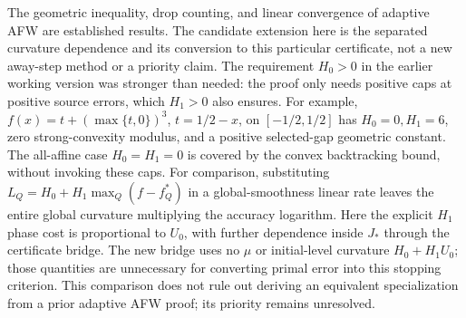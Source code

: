 The geometric inequality, drop counting, and linear convergence of
adaptive AFW are established results. The candidate extension here is
the separated curvature dependence and its conversion to this particular
certificate, not a new away-step method or a priority claim.
The requirement $H_0>0$ in the earlier working version was stronger
than needed: the proof only needs positive caps at positive source
errors, which $H_1>0$ also ensures. For example,
$f(x)=t+(\max\{t,0\})^3$, $t=1/2-x$, on $[-1/2,1/2]$ has $H_0=0,H_1=6$,
zero strong-convexity modulus, and a positive selected-gap geometric
constant. The all-affine case $H_0=H_1=0$ is covered by the convex
backtracking bound, without invoking these caps.
For comparison, substituting
$L_Q=H_0+H_1\max_Q(f-f_Q^*)$ in a global-smoothness linear rate leaves
the entire global curvature multiplying the accuracy logarithm.
Here the explicit $H_1$ phase cost is proportional to $U_0$, with further
dependence inside $J_*$ through the certificate bridge. The new bridge
uses no $\mu$ or initial-level curvature $H_0+H_1U_0$; those quantities
are unnecessary for converting primal error into this stopping criterion.
This comparison
does not rule out deriving an equivalent specialization from a prior
adaptive AFW proof; its priority remains unresolved.
